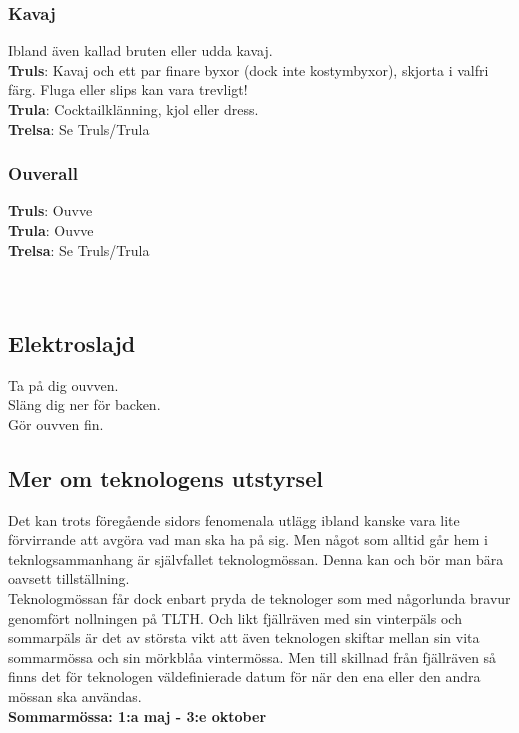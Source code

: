 \subsubsection*{Kavaj}
Ibland även kallad bruten eller udda kavaj.\\
\textbf{Truls}: Kavaj och ett par finare byxor (dock inte kostymbyxor), skjorta i valfri färg. Fluga eller slips kan vara trevligt!\\
\textbf{Trula}: Cocktailklänning, kjol eller dress.\\
\textbf{Trelsa}: Se Truls/Trula

\subsubsection*{Ouverall}
\textbf{Truls}: Ouvve\\
\textbf{Trula}: Ouvve\\
\textbf{Trelsa}: Se Truls/Trula
\\
\\
\\
\subsection*{Elektroslajd}
Ta på dig ouvven.\\
Släng dig ner för backen.\\
Gör ouvven fin.

\newpage

\subsection*{Mer om teknologens utstyrsel}
Det kan trots föregående sidors fenomenala utlägg ibland kanske vara lite förvirrande att avgöra vad man ska ha på sig.
Men något som alltid går hem i teknlogsammanhang är självfallet teknologmössan. 
Denna kan och bör man bära oavsett tillställning.
\\


Teknologmössan får dock enbart pryda de teknologer som med någorlunda bravur genomfört nollningen på TLTH.
Och likt fjällräven med sin vinterpäls och sommarpäls är det av största vikt att även teknologen skiftar mellan sin vita sommarmössa och sin mörkblåa vintermössa.
Men till skillnad från fjällräven så finns det för teknologen väldefinierade datum för när den ena eller den andra mössan ska användas.
\\


\textbf{Sommarmössa: 1:a maj - 3:e oktober}


